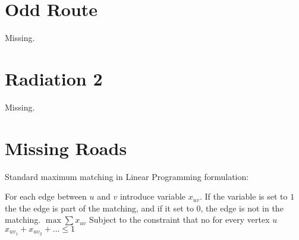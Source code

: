 \documentclass[a4paper, 10pt]{article}
\let\stdsection\section
\renewcommand\section{\newpage\stdsection}
\newcommand{\includecode}[1]{
    }
\newcommand{\algoAuthor}{2} %
\begin{document}
    \section{Odd Route}
        \label{sec:odd_route}
        Missing.
        \includecode{../problems/w13/OddRoute/OddRoute\algoAuthor.cpp}
        
    \section{Radiation 2}
        \label{sec:radiation_2}
        Missing.

    \section{Missing Roads}
        \label{sec:missing_roads}
        Standard maximum matching in Linear Programming formulation:

        For each edge between $u$ and $v$ introduce variable $x_{uv}$. If the variable is set to $1$ the the edge is part of the matching, 
        and if it set to 0, the edge is not in the matching.
        $\max \sum x_{uv}$
        Subject to the constraint that no for every vertex $u$
        $x_{uv_1} + x_{uv_2} + \dots \leq 1$
    
    
\end{document}
